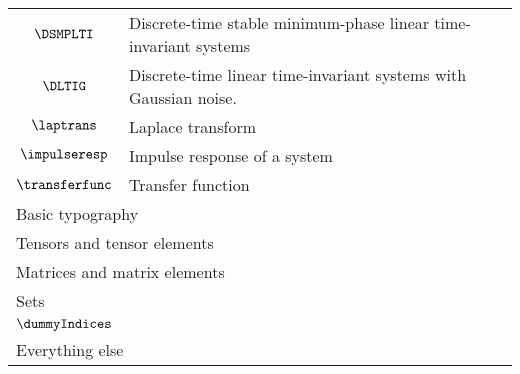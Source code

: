 \begin{longtable}{cl}
 $\DSMPLTI$ &  Discrete-time stable minimum-phase linear time-invariant systems\\ 
 $\DLTIG$ &  Discrete-time linear time-invariant systems with Gaussian noise.\\ 
 $\laptrans$ &  Laplace transform\\ 
 $\impulseresp$ &  Impulse response of a system\\ 
 $\transferfunc$ &  Transfer function\\ 
 \multicolumn{2}{l}{Basic typography}\\ 
 \hline
\hline
\multicolumn{2}{l}{Tensors and tensor elements}\\ 
 \hline
\multicolumn{2}{l}{Matrices and matrix elements}\\ 
 \hline
\multicolumn{2}{l}{Sets}\\ 
 \hline
$\dummyIndices$ & \\ 
 \multicolumn{2}{l}{Everything else}\\ 
 \hline
\end{longtable}
